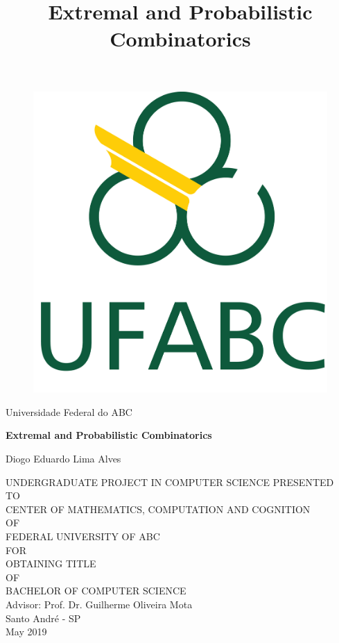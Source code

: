 \documentclass[12pt,twoside,a4paper,bibliography=totocnumbered]{book}
\numberwithin{equation}{section}
\theoremstyle{remark}
\begin{document}

\title{Extremal and Probabilistic Combinatorics}

      \begin{figure}[h!]%
        \centering%
        \includegraphics[scale=0.2]{Figuras/logo.png}%
      \end{figure}%
\begin{center}
Universidade Federal do ABC\\

\vspace{2cm}

{
\fontsize{18pt}{\baselineskip}\selectfont \bf
Extremal and Probabilistic Combinatorics
}

\vspace{2cm}

Diogo Eduardo Lima Alves\\

\vspace{2cm}

UNDERGRADUATE PROJECT IN COMPUTER SCIENCE PRESENTED\\
TO\\
CENTER OF MATHEMATICS, COMPUTATION AND COGNITION\\
OF\\
FEDERAL UNIVERSITY OF ABC\\
FOR\\
OBTAINING TITLE\\
OF\\
BACHELOR OF COMPUTER SCIENCE\\
\vspace{2cm}
Advisor: Prof. Dr. Guilherme Oliveira Mota\\
\vfill
Santo André - SP\\
May 2019
\end{center}
\end{document}

